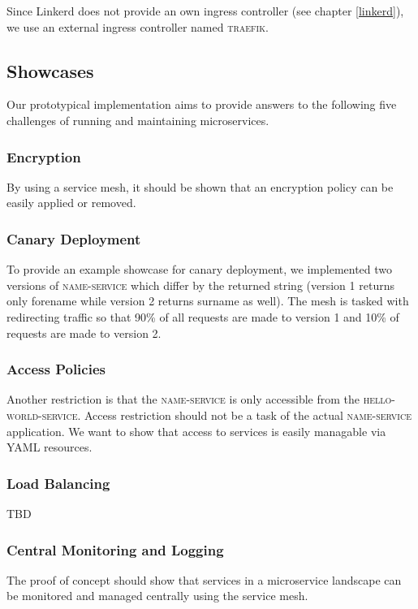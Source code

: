 Since Linkerd does not provide an own ingress controller (see chapter \ref{linkerd}), we use an external ingress controller named \textsc{traefik}.

\subsection{Showcases}
\label{sec:showcases-1}

Our prototypical implementation aims to provide answers to the following five challenges of running and maintaining microservices.

\subsubsection{Encryption}

By using a service mesh, it should be shown that an encryption policy can be easily applied or removed.

\subsubsection{Canary Deployment}

To provide an example showcase for canary deployment, we implemented two versions of \textsc{name-service} which differ by the returned string (version 1 returns only forename while version 2 returns surname as well).
The mesh is tasked with redirecting traffic so that 90\% of all requests are made to version 1 and 10\% of requests are made to version 2.

\subsubsection{Access Policies}

Another restriction is that the \textsc{name-service} is only accessible from the \textsc{hello-world-service}. Access restriction should not be a task of the actual \textsc{name-service} application. We want to show that access to services is easily managable via YAML resources.


\subsubsection{Load Balancing}
TBD

\subsubsection{Central Monitoring and Logging}
The proof of concept should show that services in a microservice landscape can be monitored and managed centrally using the service mesh.

